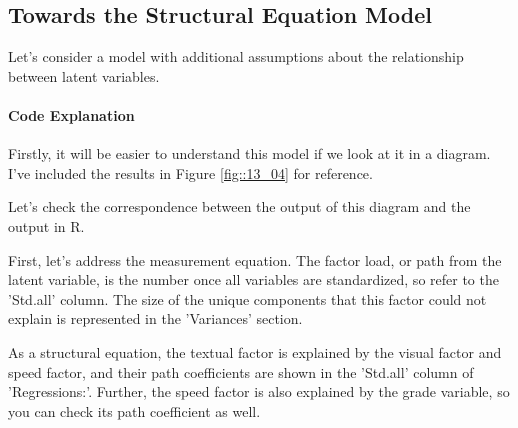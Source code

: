 \documentclass{ltjsbook}
\begin{document}
\subsection{Towards the Structural Equation Model}
Let's consider a model with additional assumptions about the relationship between latent variables.



\paragraph{Code Explanation}


Firstly, it will be easier to understand this model if we look at it in a diagram. I've included the results in Figure \ref{fig::13_04} for reference.


Let's check the correspondence between the output of this diagram and the output in R.

First, let's address the measurement equation. The factor load, or path from the latent variable, is the number once all variables are standardized, so refer to the 'Std.all' column. The size of the unique components that this factor could not explain is represented in the 'Variances' section.

As a structural equation, the textual factor is explained by the visual factor and speed factor, and their path coefficients are shown in the 'Std.all' column of 'Regressions:'. Further, the speed factor is also explained by the grade variable, so you can check its path coefficient as well.
\end{document}
